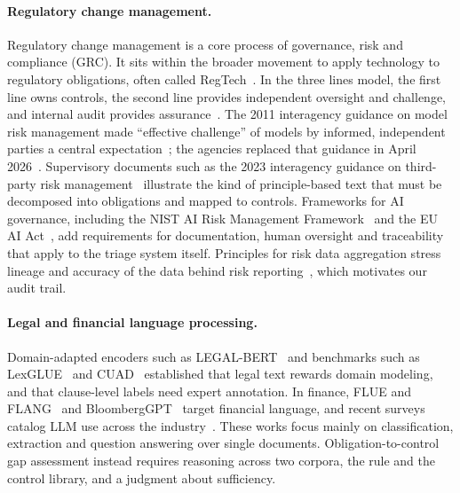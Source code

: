 \documentclass[sigconf,review,anonymous]{acmart}
\begin{document}
\paragraph{Regulatory change management.}
Regulatory change management is a core process of governance, risk and
compliance (GRC). It sits within the broader movement to apply technology to
regulatory obligations, often called RegTech~\cite{arner2017fintech}. In the
three lines model, the first line owns controls, the second line provides
independent oversight and challenge, and internal audit provides
assurance~\cite{iia3lines}. The 2011 interagency guidance on model risk
management made ``effective challenge'' of models by informed, independent
parties a central expectation~\cite{sr117}; the agencies replaced that
guidance in April 2026~\cite{mrm2026}. Supervisory documents such as the 2023 interagency
guidance on third-party risk management~\cite{tprm2023} illustrate the kind of
principle-based text that must be decomposed into obligations and mapped to
controls. Frameworks for AI governance, including the NIST AI Risk Management
Framework~\cite{nistairmf} and the EU AI Act~\cite{euaiact}, add
requirements for documentation, human oversight and traceability that apply
to the triage system itself. Principles for risk data aggregation stress
lineage and accuracy of the data behind risk reporting~\cite{bcbs239}, which
motivates our audit trail.

\paragraph{Legal and financial language processing.}
Domain-adapted encoders such as LEGAL-BERT~\cite{chalkidis2020legalbert} and
benchmarks such as LexGLUE~\cite{chalkidis2022lexglue} and
CUAD~\cite{hendrycks2021cuad} established that legal text rewards domain
modeling, and that clause-level labels need expert annotation. In finance,
FLUE and FLANG~\cite{shah2022flang} and BloombergGPT~\cite{wu2023bloomberggpt}
target financial language, and recent surveys catalog LLM use across the
industry~\cite{li2023llmfinance}. These works focus mainly on classification,
extraction and question answering over single documents. Obligation-to-control
gap assessment instead requires reasoning across two corpora, the rule and the
control library, and a judgment about sufficiency.
\end{document}
